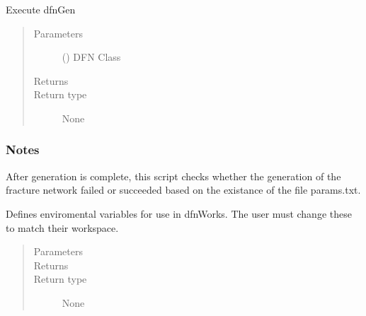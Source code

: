 \documentclass[letterpaper,10pt,english]{sphinxmanual}
\begin{document}
\begin{fulllineitems}
\begin{fulllineitems}
\label{\detokenize{pydfnworks:pydfnworks.general.dfnworks.DFNWORKS.create_network}}
Execute dfnGen
\begin{quote}\begin{description}
\item[{Parameters}] \leavevmode
{} () \textendash{} DFN Class

\item[{Returns}] \leavevmode


\item[{Return type}] \leavevmode
None

\end{description}\end{quote}
\subsubsection*{Notes}

After generation is complete, this script checks whether the generation of the fracture network failed or succeeded based on the existance of the file params.txt.

\end{fulllineitems}


\begin{fulllineitems}
\label{\detokenize{pydfnworks:pydfnworks.general.dfnworks.DFNWORKS.define_paths}}
Defines enviromental variables for use in dfnWorks. The user must change these to match their workspace.
\begin{quote}\begin{description}
\item[{Parameters}] \leavevmode
{} \textendash{} 

\item[{Returns}] \leavevmode


\item[{Return type}] \leavevmode
None

\end{description}\end{quote}

\end{fulllineitems}
\end{fulllineitems}
\end{document}
